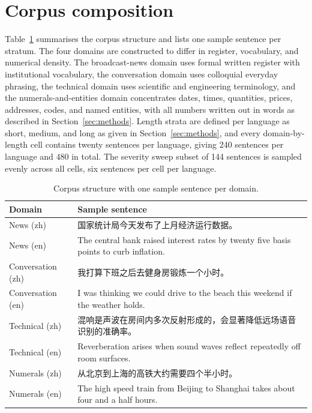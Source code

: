 \appendix
\section{Corpus composition}
\label{app:corpus}

Table~\ref{tab:corpus} summarises the corpus structure and lists one sample
sentence per stratum. The four domains are constructed to differ in register,
vocabulary, and numerical density. The broadcast-news domain uses formal
written register with institutional vocabulary, the conversation domain uses
colloquial everyday phrasing, the technical domain uses scientific and
engineering terminology, and the numerals-and-entities domain concentrates
dates, times, quantities, prices, addresses, codes, and named entities, with
all numbers written out in words as described in
Section~\ref{sec:methods}. Length strata are defined per language as short,
medium, and long as given in Section~\ref{sec:methods}, and every
domain-by-length cell contains twenty sentences per language, giving 240
sentences per language and 480 in total. The severity sweep subset of 144
sentences is sampled evenly across all cells, six sentences per cell per
language.

\begin{table}[h]
\centering
\caption{Corpus structure with one sample sentence per domain.}
\label{tab:corpus}
\small
\begin{tabular}{lp{8.8cm}}
\toprule
Domain & Sample sentence \\
\midrule
News (zh) & 国家统计局今天发布了上月经济运行数据。 \\
News (en) & The central bank raised interest rates by twenty five basis points to curb inflation. \\
Conversation (zh) & 我打算下班之后去健身房锻炼一个小时。 \\
Conversation (en) & I was thinking we could drive to the beach this weekend if the weather holds. \\
Technical (zh) & 混响是声波在房间内多次反射形成的，会显著降低远场语音识别的准确率。 \\
Technical (en) & Reverberation arises when sound waves reflect repeatedly off room surfaces. \\
Numerals (zh) & 从北京到上海的高铁大约需要四个半小时。 \\
Numerals (en) & The high speed train from Beijing to Shanghai takes about four and a half hours. \\
\bottomrule
\end{tabular}
\end{table}

